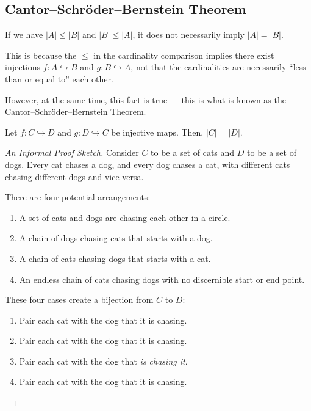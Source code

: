 \documentclass[10pt]{mypackage}
\begin{document}
\subsection{Cantor--Schröder--Bernstein Theorem}%
\begin{example}
  If we have $|A| \leq |B|$ and $|B| \leq |A|$, it does not necessarily imply $|A| = |B|$.\newline

  This is because the $\leq$ in the cardinality comparison implies there exist injections $f: A\hookrightarrow B$ and $g: B\hookrightarrow A$, not that the cardinalities are necessarily ``less than or equal to'' each other.\newline

  However, at the same time, this fact is true --- this is what is known as the Cantor--Schröder--Bernstein Theorem.
\end{example}
\begin{theorem}
  Let $f: C\hookrightarrow D$ and $g: D\hookrightarrow C$ be injective maps. Then, $|C| = |D|$.
\end{theorem}
\begin{proof}[An Informal Proof Sketch]
  Consider $C$ to be a set of cats and $D$ to be a set of dogs. Every cat chases a dog, and every dog chases a cat, with different cats chasing different dogs and vice versa.\newline

  There are four potential arrangements:
  \begin{enumerate}[(1)]
    \item A set of cats and dogs are chasing each other in a circle.
    \item A chain of dogs chasing cats that starts with a dog.
    \item A chain of cats chasing dogs that starts with a cat.
    \item An endless chain of cats chasing dogs with no discernible start or end point.
  \end{enumerate}
  These four cases create a bijection from $C$ to $D$:
  \begin{enumerate}[(1)]
    \item Pair each cat with the dog that it is chasing.
    \item Pair each cat with the dog that it is chasing.
    \item Pair each cat with the dog that \textit{is chasing it}.
    \item Pair each cat with the dog that it is chasing.
  \end{enumerate}
\end{proof}
\end{document}
